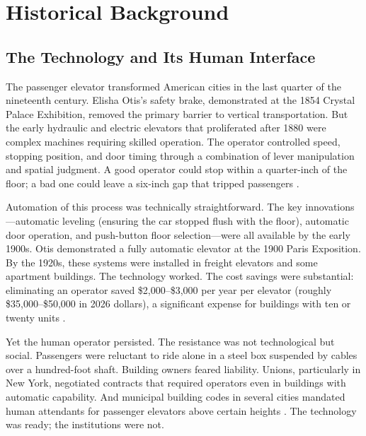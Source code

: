 \documentclass[12pt]{article}
\begin{document}

\section{Historical Background} \label{sec:background}

\subsection{The Technology and Its Human Interface}

The passenger elevator transformed American cities in the last quarter of the nineteenth century. Elisha Otis's safety brake, demonstrated at the 1854 Crystal Palace Exhibition, removed the primary barrier to vertical transportation. But the early hydraulic and electric elevators that proliferated after 1880 were complex machines requiring skilled operation. The operator controlled speed, stopping position, and door timing through a combination of lever manipulation and spatial judgment. A good operator could stop within a quarter-inch of the floor; a bad one could leave a six-inch gap that tripped passengers \citep{goodwin2005}.

Automation of this process was technically straightforward. The key innovations---automatic leveling (ensuring the car stopped flush with the floor), automatic door operation, and push-button floor selection---were all available by the early 1900s. Otis demonstrated a fully automatic elevator at the 1900 Paris Exposition. By the 1920s, these systems were installed in freight elevators and some apartment buildings. The technology worked. The cost savings were substantial: eliminating an operator saved \$2,000--\$3,000 per year per elevator (roughly \$35,000--\$50,000 in 2026 dollars), a significant expense for buildings with ten or twenty units \citep{price2013}.

Yet the human operator persisted. The resistance was not technological but social. Passengers were reluctant to ride alone in a steel box suspended by cables over a hundred-foot shaft. Building owners feared liability. Unions, particularly in New York, negotiated contracts that required operators even in buildings with automatic capability. And municipal building codes in several cities mandated human attendants for passenger elevators above certain heights \citep{bernard2014}. The technology was ready; the institutions were not.
\end{document}
